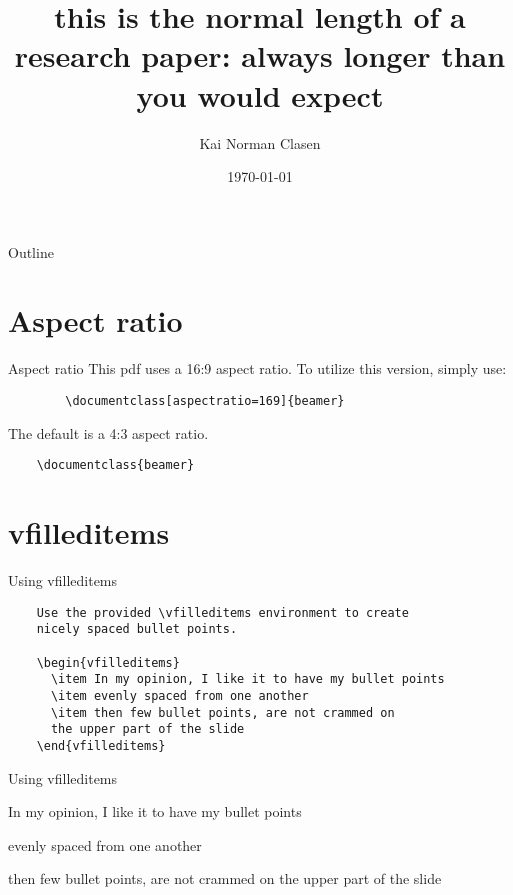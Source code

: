 \documentclass[aspectratio=169]{beamer}
\title[short title]{this is the normal length of a research paper:
always longer than you would expect}
\author{Kai Norman Clasen}
\institute{insitute name}
\date{\today}
\begin{document}
\maketitle

\begin{frame}{Outline}
  \tableofcontents
\end{frame}

\section{Aspect ratio}
\begin{frame}[fragile]{Aspect ratio}
  This pdf uses a 16:9 aspect ratio. To utilize
  this version, simply use:
  \begin{verbatim}
        \documentclass[aspectratio=169]{beamer}
    \end{verbatim}
  \vfill
  The default is a 4:3 aspect ratio.
  \begin{verbatim}
    \documentclass{beamer}
  \end{verbatim}
\end{frame}


\section{vfilleditems}
\begin{frame}[fragile]{Using vfilleditems}
  \begin{verbatim}
    Use the provided \vfilleditems environment to create 
    nicely spaced bullet points.

    \begin{vfilleditems}
      \item In my opinion, I like it to have my bullet points
      \item evenly spaced from one another
      \item then few bullet points, are not crammed on 
      the upper part of the slide
    \end{vfilleditems}
    \end{verbatim}
\end{frame}

\begin{frame}{Using vfilleditems}
  \begin{vfilleditems}
    \item In my opinion, I like it to have my bullet points
    \item evenly spaced from one another
    \item then few bullet points, are not crammed on
    the upper part of the slide
  \end{vfilleditems}
\end{frame}
\end{document}
